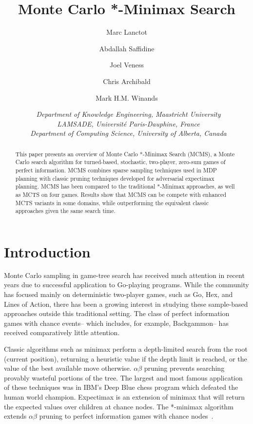 \documentclass{article}
\title{\textbf{\huge Monte Carlo *-Minimax Search\footnotemark[1]}}
\author{Marc Lanctot\affila \and
        Abdallah Saffidine\affilb \and
        Joel Veness\affilc \and
        Chris Archibald\affilc \and 
        Mark H.M. Winands\affila}
\date{\small \affila\ \textit{Department of Knowledge Engineering, Maastricht University}\\
      \affilb\ \textit{LAMSADE, Universit\'{e} Paris-Dauphine, France}\\
      \affilc\ \textit{Department of Computing Science, University of Alberta, Canada}}
\begin{document}
\ttl
\thispagestyle{empty}



\begin{abstract}
\noindent   This paper presents an overview of Monte Carlo *-Minimax Search (MCMS), a Monte Carlo search algorithm for 
  turned-based, stochastic, two-player, zero-sum games of perfect information.
  MCMS combines sparse sampling techniques used in MDP planning with classic pruning techniques developed 
  for adversarial expectimax planning.
  MCMS has been compared to the traditional *-Minimax approaches, as well as MCTS  
  on four games. Results show that MCMS can be compete with enhanced MCTS variants in some domains, 
  while outperforming the equivalent classic approaches given the same search time. 
\end{abstract}


\section{Introduction}

Monte Carlo sampling in game-tree search has received much attention in recent years due to successful application to 
Go-playing programs. 
While the community has focused mainly on deterministic two-player games, such as Go, Hex, and Lines of Action, there
has been a growing interest in studying these sample-based approaches outside this traditional setting. The class of 
perfect information games with chance events-- which includes, for example, Backgammon-- has received comparatively 
little attention. 

Classic algorithms such as minimax perform a depth-limited search from the root (current position), 
returning a heuristic value if the depth limit is reached, or the value of the best available move otherwise.  
$\alpha \beta$ pruning prevents searching provably wasteful portions of the tree. The largest 
and most famous application of these techniques was in IBM's Deep Blue chess program which defeated the human world 
champion. Expectimax is an extension of minimax that will return the expected values over children at 
chance nodes. The *-minimax algorithm extends $\alpha \beta$ pruning to perfect information games with 
chance nodes~\cite{Ballard83}. 
\end{document}
